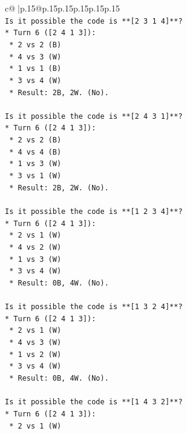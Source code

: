 \documentclass{article}
\begin{document}
{\begin{supertabular}{c@{$\;$}|p{.15\linewidth}@{}p{.15\linewidth}p{.15\linewidth}p{.15\linewidth}p{.15\linewidth}p{.15\linewidth}}
{{{\\ 
\texttt{Is it possible the code is **{[}2 3 1 4{]}**?} \\
\texttt{*   Turn 6 ({[}2 4 1 3{]}):} \\
\texttt{    *   2 vs 2 (B)} \\
\texttt{    *   4 vs 3 (W)} \\
\texttt{    *   1 vs 1 (B)} \\
\texttt{    *   3 vs 4 (W)} \\
\texttt{    *   Result: 2B, 2W. (No).} \\
\\ 
\texttt{Is it possible the code is **{[}2 4 3 1{]}**?} \\
\texttt{*   Turn 6 ({[}2 4 1 3{]}):} \\
\texttt{    *   2 vs 2 (B)} \\
\texttt{    *   4 vs 4 (B)} \\
\texttt{    *   1 vs 3 (W)} \\
\texttt{    *   3 vs 1 (W)} \\
\texttt{    *   Result: 2B, 2W. (No).} \\
\\ 
\texttt{Is it possible the code is **{[}1 2 3 4{]}**?} \\
\texttt{*   Turn 6 ({[}2 4 1 3{]}):} \\
\texttt{    *   2 vs 1 (W)} \\
\texttt{    *   4 vs 2 (W)} \\
\texttt{    *   1 vs 3 (W)} \\
\texttt{    *   3 vs 4 (W)} \\
\texttt{    *   Result: 0B, 4W. (No).} \\
\\ 
\texttt{Is it possible the code is **{[}1 3 2 4{]}**?} \\
\texttt{*   Turn 6 ({[}2 4 1 3{]}):} \\
\texttt{    *   2 vs 1 (W)} \\
\texttt{    *   4 vs 3 (W)} \\
\texttt{    *   1 vs 2 (W)} \\
\texttt{    *   3 vs 4 (W)} \\
\texttt{    *   Result: 0B, 4W. (No).} \\
\\ 
\texttt{Is it possible the code is **{[}1 4 3 2{]}**?} \\
\texttt{*   Turn 6 ({[}2 4 1 3{]}):} \\
\texttt{    *   2 vs 1 (W)} \\
}}}
\end{supertabular}}
\end{document}
